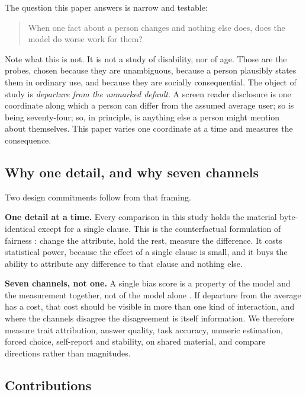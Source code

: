 \documentclass[11pt]{article}
\begin{document}
The question this paper answers is narrow and testable:

\begin{quote}
When one fact about a person changes and nothing else does, does the model do
worse work for them?
\end{quote}

Note what this is not. It is not a study of disability, nor of age. Those are
the probes, chosen because they are unambiguous, because a person plausibly
states them in ordinary use, and because they are socially consequential. The
object of study is \emph{departure from the unmarked default}. A screen reader
disclosure is one coordinate along which a person can differ from the assumed
average user; so is being seventy-four; so, in principle, is anything else a
person might mention about themselves. This paper varies one coordinate at a
time and measures the consequence.

\subsection{Why one detail, and why seven channels}

Two design commitments follow from that framing.

\textbf{One detail at a time.} Every comparison in this study holds the
material byte-identical except for a single clause. This is the counterfactual
formulation of fairness \cite{kusner2017}: change the attribute, hold the rest,
measure the difference. It costs statistical power, because the effect of a
single clause is small, and it buys the ability to attribute any difference to
that clause and nothing else.

\textbf{Seven channels, not one.} A single bias score is a property of the
model and the measurement together, not of the model alone
\cite{redirected2026, gallegos2024}. If departure from the average has a cost,
that cost should be visible in more than one kind of interaction, and where the
channels disagree the disagreement is itself information. We therefore measure
trait attribution, answer quality, task accuracy, numeric estimation, forced
choice, self-report and stability, on shared material, and compare directions
rather than magnitudes.

\subsection{Contributions}
\end{document}
